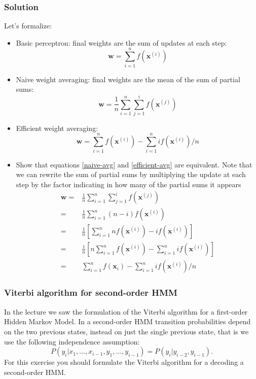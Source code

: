 \documentclass{beamer}
\newcommand{\x}{\mathbf{x}}
\newcommand{\w}{\mathbf{w}}
\begin{document}
\begin{frame}
\frametitle{Solution}
\begin{block}{}
 Let's formalize:
\begin{itemize}
 \item Basic perceptron: final weights are the sum of updates at each step: 
\begin{equation}
\w = \sum_{i=1}^n f(\x^{(i)}) 
\end{equation}\pause
\item Naive weight averaging: final weights are the mean of the sum of partial sums:
\begin{equation}
 \w = \frac{1}{n} \sum_{i=1}^n \sum_{j=1}^i f(\x^{(j)})
\label{naive-avg}
\end{equation}\pause
\item Efficient weight averaging: 
\begin{equation}
\w = \sum_{i=1}^n f(\x^{(i)}) - \sum_{i=1}^n i f(\x^{(i)}) / n                                   
\label{efficient-avg}
\end{equation}
\end{itemize}
\end{block}
\end{frame}


\begin{frame}
\begin{itemize}
 \item Show that equations \ref{naive-avg} and \ref{efficient-avg} are equivalent. 
Note that we can rewrite the sum of partial sums by multiplying the update at each step by the factor indicating in how many of the partial sums it appears
\begin{align}
\w =& \frac{1}{n} \sum_{i=1}^n \sum_{j=1}^i f(\x^{(j)}) \\
 =  & \frac{1}{n} \sum_{i=1}^n (n-i) f(\x^{(i)})\\
 =  & \frac{1}{n} \left[\sum_{i=1}^n n f(\x^{(i)}) - i f(\x^{(i)})\right]\\
 =  & \frac{1}{n} \left[n\sum_{i=1}^n f(\x^{(i)}) - \sum_{i=1}^n i f(\x^{(i)})\right]\\
 =  & \sum_{i=1}^n f(\x_i) - \sum_{i=1}^n i f(\x^{(i)})/n
\end{align}
\end{itemize}
\end{frame}

\begin{frame}
  \frametitle{Viterbi algorithm for second-order HMM} In the lecture
  we saw the formulation of the Viterbi algorithm for a first-order
  Hidden Markov Model. In a second-order HMM transition probabilities
  depend on the two previous states, instead on just the single
  previous state, that is we use the following independence
  assumption:
  \[
  P(y_i|x_1,\ldots,x_{i-1},y_1,\ldots,y_{i-1}) =
  P(y_i|y_{i-2},y_{i-1}).
  \]
  For this exercise you should formulate the Viterbi algorithm for a
  decoding a second-order HMM.
\end{frame}
\end{document}
